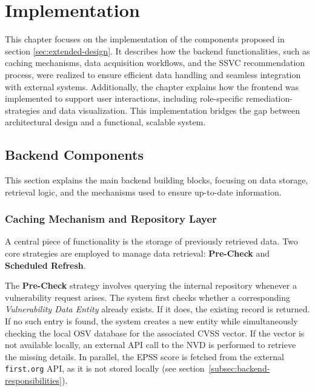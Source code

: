 \chapter{Implementation}
\label{chapter:implementation}

This chapter focuses on the implementation of the components proposed in section \ref{sec:extended-design}. It describes how the backend functionalities, such as caching mechanisms, data acquisition workflows, and the \ac{SSVC} recommendation process, were realized to ensure efficient data handling and seamless integration with external systems. Additionally, the chapter explains how the frontend was implemented to support user interactions, including role-specific remediation-strategies and data visualization. This implementation bridges the gap between architectural design and a functional, scalable system.

\section{Backend Components}
\label{sec:backend-components}

This section explains the main backend building blocks, focusing on data storage, retrieval logic, and the mechanisms used to ensure up-to-date information.

\subsection{Caching Mechanism and Repository Layer}
\label{subsec:caching-repository}

A central piece of functionality is the storage of previously retrieved data. Two core strategies are employed to manage data retrieval: \textbf{Pre-Check} and \textbf{Scheduled Refresh}.

The \textbf{Pre-Check} strategy involves querying the internal repository whenever a vulnerability request arises. The system first checks whether a corresponding \textit{Vulnerability Data Entity} already exists. If it does, the existing record is returned. If no such entry is found, the system creates a new entity while simultaneously checking the local \ac{OSV} database for the associated \ac{CVSS} vector. If the vector is not available locally, an external \ac{API} call to the \ac{NVD} is performed to retrieve the missing details. In parallel, the \ac{EPSS} score is fetched from the external \texttt{first.org} \ac{API}, as it is not stored locally (see section~\ref{subsec:backend-responsibilities}).

